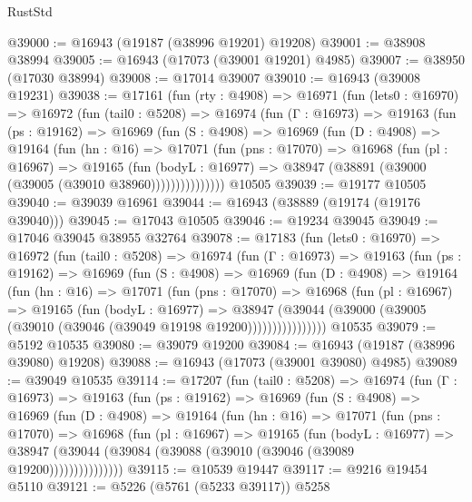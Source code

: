 \begin{lexlean}{RustStd}
\begin{coremodule}
@39000 := @16943 (@19187 (@38996 @19201) @19208)
@39001 := @38908 @38994
@39005 := @16943 (@17073 (@39001 @19201) @4985)
@39007 := @38950 (@17030 @38994)
@39008 := @17014 @39007
@39010 := @16943 (@39008 @19231)
@39038 := @17161
    (fun (rty : @4908) =>
    @16971
      (fun (lets0 : @16970) =>
      @16972
        (fun (tail0 : @5208) =>
        @16974
          (fun (Γ : @16973) =>
          @19163
            (fun (ps : @19162) =>
            @16969
              (fun (S : @4908) =>
              @16969
                (fun (D : @4908) =>
                @19164
                  (fun (hn : @16) =>
                  @17071
                    (fun (pns : @17070) =>
                    @16968
                      (fun (pl : @16967) =>
                      @19165
                        (fun (bodyL : @16977) =>
                        @38947 (@38891 (@39000 (@39005 (@39010 @38960)))))))))))))))
    @10505
@39039 := @19177 @10505
@39040 := @39039 @16961
@39044 := @16943 (@38889 (@19174 (@19176 @39040)))
@39045 := @17043 @10505
@39046 := @19234 @39045
@39049 := @17046 @39045 @38955 @32764
@39078 := @17183
    (fun (lets0 : @16970) =>
    @16972
      (fun (tail0 : @5208) =>
      @16974
        (fun (Γ : @16973) =>
        @19163
          (fun (ps : @19162) =>
          @16969
            (fun (S : @4908) =>
            @16969
              (fun (D : @4908) =>
              @19164
                (fun (hn : @16) =>
                @17071
                  (fun (pns : @17070) =>
                  @16968
                    (fun (pl : @16967) =>
                    @19165
                      (fun (bodyL : @16977) =>
                      @38947
                        (@39044
                          (@39000 (@39005 (@39010 (@39046 (@39049 @19198 @19200))))))))))))))))
    @10535
@39079 := @5192 @10535
@39080 := @39079 @19200
@39084 := @16943 (@19187 (@38996 @39080) @19208)
@39088 := @16943 (@17073 (@39001 @39080) @4985)
@39089 := @39049 @10535
@39114 := @17207
    (fun (tail0 : @5208) =>
    @16974
      (fun (Γ : @16973) =>
      @19163
        (fun (ps : @19162) =>
        @16969
          (fun (S : @4908) =>
          @16969
            (fun (D : @4908) =>
            @19164
              (fun (hn : @16) =>
              @17071
                (fun (pns : @17070) =>
                @16968
                  (fun (pl : @16967) =>
                  @19165
                    (fun (bodyL : @16977) =>
                    @38947 (@39044 (@39084 (@39088 (@39010 (@39046 (@39089 @19200)))))))))))))))
@39115 := @10539 @19447
@39117 := @9216 @19454 @5110
@39121 := @5226 (@5761 (@5233 @39117)) @5258

\end{coremodule}
\end{lexlean}
